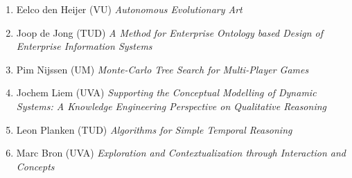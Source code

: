 \begin{multicols}{2}
\begin{scriptsize}
\begin{enumerate}[leftmargin=*,noitemsep,topsep=0pt,parsep=1pt,partopsep=0pt]
{}\item Eelco den Heijer (VU) \textit{Autonomous Evolutionary Art
}\item Joop de Jong (TUD) \textit{A Method for Enterprise Ontology based Design of Enterprise Information Systems
}\item Pim Nijssen (UM) \textit{Monte-Carlo Tree Search for Multi-Player Games
}\item Jochem Liem (UVA) \textit{Supporting the Conceptual Modelling of Dynamic Systems: A Knowledge Engineering Perspective on Qualitative Reasoning
}\item Leon Planken (TUD) \textit{Algorithms for Simple Temporal Reasoning
}\item Marc Bron (UVA) \textit{Exploration and Contextualization through Interaction and Concepts}
\end{enumerate}


\end{scriptsize}
\end{multicols}
